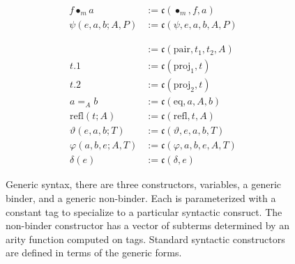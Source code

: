 \begin{figure}
\begin{minipage}{0.5\textwidth}
\begin{align*}
            f \bullet_m a &:= \mathfrak{c}(\bullet_m, f, a) \\
            \psi(e, a, b; A, P) &:= \mathfrak{c}(\psi, e, a, b, A, P)
        \end{align*}
    \end{minipage}%
    \begin{minipage}{0.5\textwidth}
        \begin{align*}
            [t_1, t_2; A] &:= \mathfrak{c}(\text{pair}, t_1, t_2, A) \\
            t.1 &:= \mathfrak{c}(\text{proj}_1, t) \\
            t.2 &:= \mathfrak{c}(\text{proj}_2, t) \\
            a =_{A} b &:= \mathfrak{c}(\text{eq}, a, A, b) \\
            \text{refl}(t; A) &:= \mathfrak{c}(\text{refl}, t, A) \\
            \vartheta(e, a, b; T) &:= \mathfrak{c}(\vartheta, e, a, b, T) \\
            \varphi(a, b, e; A, T) &:= \mathfrak{c}(\varphi, a, b, e, A, T) \\
            \delta(e) &:= \mathfrak{c}(\delta, e)
        \end{align*}
    \end{minipage}
    \caption{Generic syntax, there are three constructors, variables, a generic binder, and a generic non-binder. Each is parameterized with a constant tag to specialize to a particular syntactic consruct. The non-binder constructor has a vector of subterms determined by an arity function computed on tags. Standard syntactic constructors are defined in terms of the generic forms.}
    \label{fig:syntax}
\end{figure}
